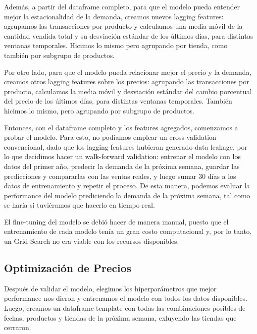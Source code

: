 \documentclass[12pt,a4paper]{article}
\begin{document}
    \vspace{0.2cm}

    Además, a partir del dataframe completo, para que el modelo pueda entender mejor la estacionalidad de la demanda, 
    creamos nuevos lagging features: agrupamos las transacciones por producto y calculamos 
    una media móvil de la cantidad vendida total y su desviación estándar de los últimos días, para distintas ventanas temporales. 
    Hicimos lo mismo pero agrupando por tienda, como también por subgrupo de productos.

    \vspace{0.2cm}

    Por otro lado, para que el modelo pueda relacionar mejor el precio y la demanda, creamos otros lagging features sobre los precios: 
    agrupando las transacciones por producto, calculamos la media móvil y desviación estándar del cambio porcentual del precio de los 
    últimos días, para distintas ventanas temporales. También hicimos lo mismo, pero agrupando por subgrupo de productos.

    \vspace{0.2cm}

    Entonces, con el dataframe completo y los features agregados, comenzamos a probar el modelo. Para esto, no podíamos emplear un cross-validation 
    convencional, dado que los lagging features hubieran generado data leakage, por lo que decidimos hacer un walk-forward validation: 
    entrenar el modelo con los datos del primer año, predecir la demanda de la próxima semana, guardar las predicciones y compararlas con 
    las ventas reales, y luego sumar 30 días a los datos de entrenamiento y repetir el proceso. De esta manera, podemos evaluar la performance del 
    modelo prediciendo la demanda de la próxima semana, tal como se haría si tuviéramos que hacerlo en tiempo real.

    \vspace{0.2cm}

    El fine-tuning del modelo se debió hacer de manera manual, puesto que el entrenamiento de cada modelo tenía un gran costo computacional 
    y, por lo tanto, un Grid Search no era viable con los recursos disponibles.



\subsection{Optimización de Precios}

Después de validar el modelo, elegimos los hiperparámetros que mejor performance nos dieron y entrenamos el modelo con todos los datos 
disponibles. Luego, creamos un dataframe template con todas las combinaciones posibles de fechas, productos y tiendas de la próxima semana, 
exluyendo las tiendas que cerraron. 
\end{document}
